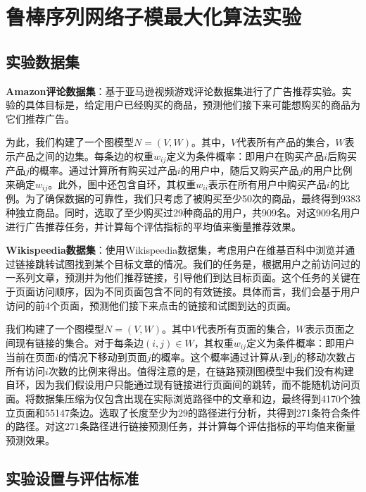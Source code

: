 
\section{鲁棒序列网络子模最大化算法实验}
\label{sec:5_1}

\subsection{实验数据集}

{\bfseries Amazon评论数据集}：基于亚马逊视频游戏评论数据集\cite{ni2019justifying}进行了广告推荐实验。实验的具体目标是，给定用户已经购买的商品，预测他们接下来可能想购买的商品为它们推荐广告。

为此，我们构建了一个图模型$N = (V,W)$。其中，$V$代表所有产品的集合，$W$表示产品之间的边集。每条边的权重$w_{ij}$定义为条件概率：即用户在购买产品$i$后购买产品$j$的概率。通过计算所有购买过产品$i$的用户中，随后又购买产品$j$的用户比例来确定$w_{ij}$。此外，图中还包含自环，其权重$w_{ii}$表示在所有用户中购买产品$i$的比例。为了确保数据的可靠性，我们只考虑了被购买至少50次的商品，最终得到9383种独立商品。同时，选取了至少购买过29种商品的用户，共909名。对这909名用户进行广告推荐任务，并计算每个评估指标的平均值来衡量推荐效果。

{\bfseries Wikispeedia数据集}：使用Wikispeedia数据集\cite{west2009wikispeedia}，考虑用户在维基百科中浏览并通过链接跳转试图找到某个目标文章的情况。我们的任务是，根据用户之前访问过的一系列文章，预测并为他们推荐链接，引导他们到达目标页面。这个任务的关键在于页面访问顺序，因为不同页面包含不同的有效链接。具体而言，我们会基于用户访问的前4个页面，预测他们接下来点击的链接和试图到达的页面。

我们构建了一个图模型$N = (V,W)$。其中$V$代表所有页面的集合，$W$表示页面之间现有链接的集合。对于每条边$(i,j)\in W$，其权重$w_{ij}$定义为条件概率：即用户当前在页面$i$的情况下移动到页面$j$的概率。这个概率通过计算从$i$到$j$的移动次数占所有访问$i$次数的比例来得出。值得注意的是，在链路预测图模型中我们没有构建自环，因为我们假设用户只能通过现有链接进行页面间的跳转，而不能随机访问页面。将数据集压缩为仅包含出现在实际浏览路径中的文章和边，最终得到4170个独立页面和55147条边。选取了长度至少为29的路径进行分析，共得到271条符合条件的路径。对这271条路径进行链接预测任务，并计算每个评估指标的平均值来衡量预测效果。



\subsection{实验设置与评估标准}

